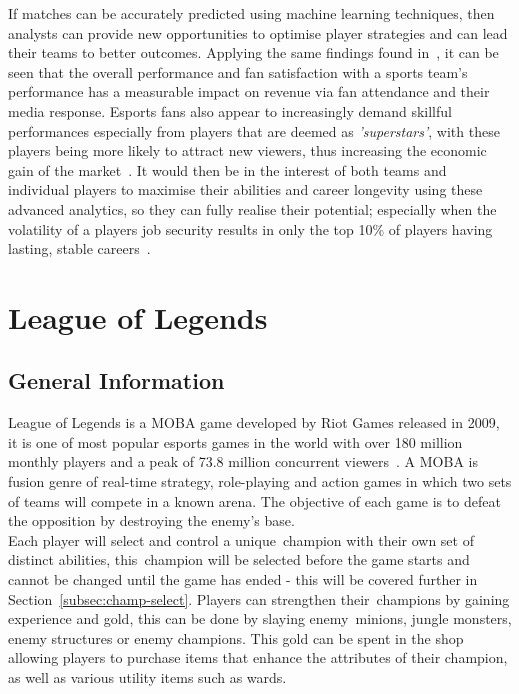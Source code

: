 If matches can be accurately predicted using machine learning techniques, then analysts can provide new opportunities to optimise player strategies and can lead their teams to better outcomes.
Applying the same findings found in~\citet{gray2012customer}, it can be seen that the overall performance and fan satisfaction with a sports team's performance has a measurable impact on revenue via fan attendance and their media response.
Esports fans also appear to increasingly demand skillful performances especially from players that are deemed as \emph{'superstars'}, with these players being more likely to attract new viewers, thus increasing the economic gain of the market~\citep{mangeloja2019economics, ward2019esport}.
It would then be in the interest of both teams and individual players to maximise their abilities and career longevity using these advanced analytics, so they can fully realise their potential;
especially when the volatility of a players job security results in only the top 10\% of players having lasting, stable careers~\citep{ward2019esport}.\\


\section{League of Legends}\label{sec:League of Legends}
\subsection{General Information}\label{subsec:general-information}
League of Legends is a \ac{MOBA} game developed by Riot Games released in 2009, it is one of most popular esports games in the world with over 180 million monthly players and a peak of 73.8 million concurrent viewers~\citep{riotplayercount, upcomerworld2021}.
A \ac{MOBA} is fusion genre of real-time strategy, role-playing and action games in which two sets of teams will compete in a known arena.
The objective of each game is to defeat the opposition by destroying the enemy's base.\\

Each player will select and control a unique~\gls{champion} with their own set of distinct abilities, this~\gls{champion} will be selected before the game starts and cannot be changed until the game has ended - this will be covered further in Section~\ref{subsec:champ-select}.
Players can strengthen their~\glspl{champion} by gaining experience and gold, this can be done by slaying enemy~\glspl{minion}, \gls{jungle} monsters, enemy structures or enemy \glspl{champion}.
This gold can be spent in the shop allowing players to purchase items that enhance the attributes of their \gls{champion}, as well as various utility items such as \glspl{ward}.\\

